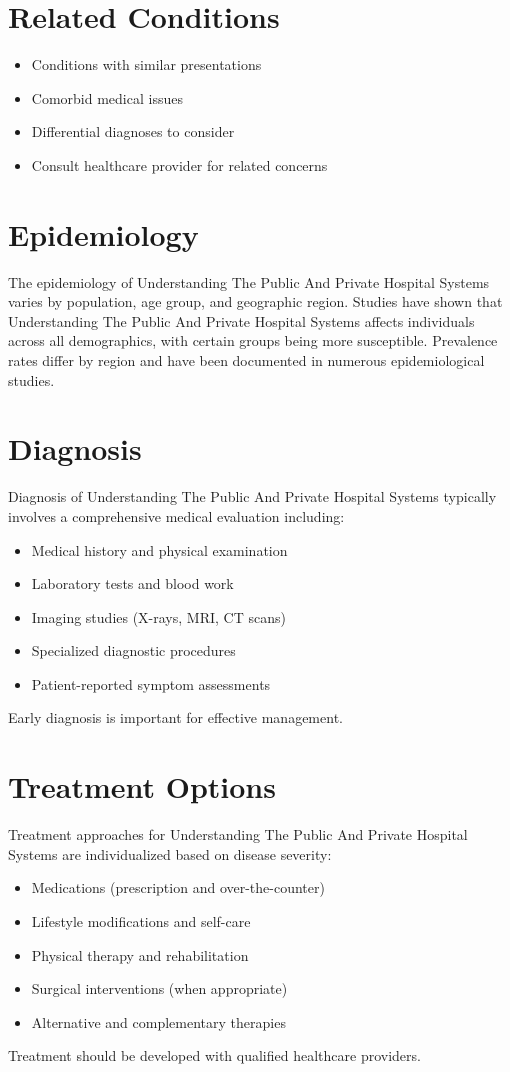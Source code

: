 \section*{Related Conditions}
\begin{itemize}
  \item Conditions with similar presentations
  \item Comorbid medical issues
  \item Differential diagnoses to consider
  \item Consult healthcare provider for related concerns
\end{itemize}

\section*{Epidemiology}
The epidemiology of Understanding The Public And Private Hospital Systems varies by population, age group, and geographic region. Studies have shown that Understanding The Public And Private Hospital Systems affects individuals across all demographics, with certain groups being more susceptible. Prevalence rates differ by region and have been documented in numerous epidemiological studies.

\section*{Diagnosis}
Diagnosis of Understanding The Public And Private Hospital Systems typically involves a comprehensive medical evaluation including:
\begin{itemize}
  \item Medical history and physical examination
  \item Laboratory tests and blood work
  \item Imaging studies (X-rays, MRI, CT scans)
  \item Specialized diagnostic procedures
  \item Patient-reported symptom assessments
\end{itemize}
Early diagnosis is important for effective management.

\section*{Treatment Options}
Treatment approaches for Understanding The Public And Private Hospital Systems are individualized based on disease severity:
\begin{itemize}
  \item Medications (prescription and over-the-counter)
  \item Lifestyle modifications and self-care
  \item Physical therapy and rehabilitation
  \item Surgical interventions (when appropriate)
  \item Alternative and complementary therapies
\end{itemize}
Treatment should be developed with qualified healthcare providers.

